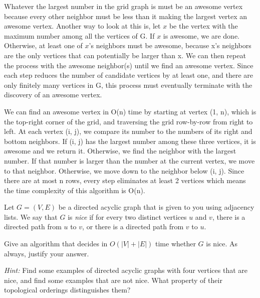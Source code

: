 \documentclass[12pt]{article}
\newcounter{ques}
\newenvironment{question}{\stepcounter{ques}{\noindent\bf Question \arabic{ques}:}}{\vspace{5mm}}
\newenvironment{solution}{{\noindent\bf Solution:}}{\vspace{5mm}}
\begin{document}
\begin{solution}
      
      Whatever the largest number in the grid graph is must be an awesome vertex because every other neighbor must be less than it making the largest vertex an awesome vertex.
      Another way to look at this is, let $x$ be the vertex with the maximum number among all the vertices of G. 
      If $x$ is awesome, we are done. Otherwise, at least one of $x$'s neighbors must be awesome, because x's neighbors are the only vertices that can potentially be larger than x. 
      We can then repeat the process with the awesome neighbor(s) until we find an awesome vertex. 
      Since each step reduces the number of candidate vertices by at least one, and there are only finitely many vertices in G, this process must eventually terminate with the discovery of an awesome vertex.

      We can find an awesome vertex in O(n) time by starting at vertex (1, n), which is the top-right corner of the grid, and traversing the grid row-by-row from right to left. 
      At each vertex (i, j), we compare its number to the numbers of its right and bottom neighbors. 
      If (i, j) has the largest number among these three vertices, it is awesome and we return it. 
      Otherwise, we find the neighbor with the largest number. If that number is larger than the number at the current vertex, we move to that neighbor. 
      Otherwise, we move down to the neighbor below (i, j). 
      Since there are at most n rows, every step eliminates at least 2 vertices which means the time complexity of this algorithm is O(n).
\end{solution}

\begin{question} 
Let $G=(V,E)$ be a directed acyclic graph that is given to you using 
adjacency lists. We say that $G$ is \emph{nice} if for every two distinct 
vertices $u$ and $v$, there is a directed path from $u$ to $v$, or there 
is a directed path from $v$ to $u$. 

Give an algorithm that decides in $O(|V|+|E|)$ time whether $G$ is nice. 
As always, justify your answer. 

\noindent 
\emph{Hint:} 
Find some examples of directed acyclic graphs with four vertices 
that are nice, and find some examples that are not nice. What 
property of their topological orderings distinguishes them?  
\end{question}
\end{document}
